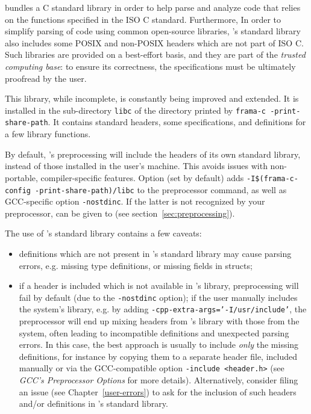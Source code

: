 \FramaC bundles a C standard library in order to help parse and analyze code
that relies on the functions specified in the ISO C standard.
Furthermore, In order to simplify parsing of code using common open-source libraries,
\FramaC's standard library also includes some POSIX and non-POSIX headers which
are not part of ISO C.
Such libraries are provided on a best-effort basis, and they are part of the
{\em trusted computing base}: to ensure its correctness, the specifications
must be ultimately proofread by the user.

This library, while incomplete, is constantly being improved and extended.
It is installed in the sub-directory \texttt{libc} of the directory printed by
\texttt{frama-c -print-share-path}. It contains standard \C headers,
some \acsl specifications, and definitions for a few library functions.

By default, \FramaC's preprocessing will include the headers of its own standard
library, instead of those installed in the user's machine. This avoids issues
with non-portable, compiler-specific features.
Option  (set by default)
adds \verb+-I$(frama-c-config -print-share-path)/libc+ to the preprocessor command, as well as
GCC-specific option \texttt{-nostdinc}. If the latter is not recognized by
your preprocessor,
 can be given to \FramaC
(see section~\ref{sec:preprocessing}).

The use of \FramaC's standard library contains a few caveats:
\begin{itemize}
\item definitions which are not present in \FramaC's standard library may cause
  parsing errors, e.g. missing type definitions, or missing fields in structs;
\item if a header is included which is not available in \FramaC's library,
  preprocessing will fail by default (due to the \texttt{-nostdinc} option);
  if the user manually includes the system's library, e.g. by adding
  \texttt{-cpp-extra-args='-I/usr/include'}, the preprocessor will end up
  mixing headers from \FramaC's library with those from the system, often
  leading to incompatible definitions and unexpected parsing errors.
  In this case, the best approach is usually to include {\em only} the missing
  definitions, for instance by copying them to a separate header file, included
  manually or via the GCC-compatible option \texttt{-include <header.h>}
  (see {\em GCC's Preprocessor Options} for more details). Alternatively,
  consider filing an issue (see Chapter~\ref{user-errors}) to ask for the
  inclusion of such headers and/or definitions in \FramaC's standard library.
\end{itemize}

